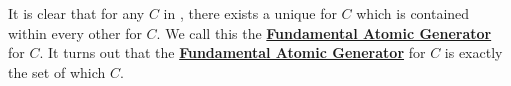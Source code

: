\newcommand{\FundamentalAtomicGenerator}[0]{\textbf{\hyperref[rmk:FundamentalAtomicGenerator]{Fundamental Atomic Generator}}\xspace}
\begin{rmk}
\label{rmk:FundamentalAtomicGenerator}

\rm
    It is clear that
    for any \WFF $C$ 
    in \scG, 
    there exists a 
    unique \CompleteCollectionOfStatementLetters
    for $C$ 
    which is contained within every 
    other 
    \CompleteCollectionOfStatementLetters
    for $C$. 
    We call this the \FundamentalAtomicGenerator
    for $C$. 
    It turns out that the 
    \FundamentalAtomicGenerator for $C$ 
    is exactly the set of \AtomicFormulae
    which
    \WFFAppearsInWFF
    $C$.      
\end{rmk}
